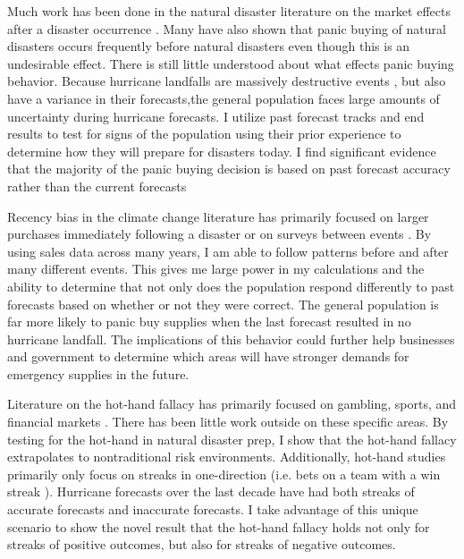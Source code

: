 \documentclass{article}
\begin{document}
Much work has been done in the natural disaster literature on the market effects after a disaster occurrence \citep{groen2008effect,semenza2011climate,deryugina2017fiscal,deryugina2018economic,sytsma2020impact}. Many have also shown that panic buying of natural disasters occurs frequently before natural disasters even though this is an undesirable effect\citep{NorrisEtAl99,Baker11,beatty2019disaster}. There is still little understood about what effects panic buying behavior. Because hurricane landfalls are massively destructive events \cite{DisasterCosts}, but also have a variance in their forecasts,the general population faces large amounts of uncertainty during hurricane forecasts. I utilize past forecast tracks and end results to test for signs of the population using their prior experience to determine how they will prepare for disasters today. I find significant evidence that the majority of the panic buying decision is based on past forecast accuracy rather than the current forecasts

Recency bias in the climate change literature has primarily focused on larger purchases immediately following a disaster \citep{hallstrom2005market,gallagher2014learning, bakkensen2019flood} or on surveys between events \cite{kelly2012evolution, MeyerEtAl14}. By using sales data across many years, I am able to follow patterns before and after many different events. This gives me large power in my calculations and the ability to determine that not only does the population respond differently to past forecasts based on whether or not they were correct. The general population is far more likely to panic buy supplies when the last forecast resulted in no hurricane landfall. The implications of this behavior could further help businesses and government to determine which areas will have stronger demands for emergency supplies in the future.

Literature on the hot-hand fallacy has primarily focused on gambling, sports, and financial markets \cite{croson2005gambler,rigotti2005uncertainty,rabin2010gambler,stockl2015hot,studer2015put}. There has been little work outside on these specific areas. By testing for the hot-hand in  natural disaster prep, I show that the hot-hand fallacy extrapolates to nontraditional risk environments. Additionally, hot-hand studies primarily only focus on streaks in one-direction (i.e. bets on a team with a win streak \citep{durand2021behavioral}). Hurricane forecasts over the last decade have had both streaks of accurate forecasts and inaccurate forecasts. I take advantage of this unique scenario to show the novel result that the hot-hand fallacy holds not only for streaks of positive outcomes, but also for streaks of negative outcomes.
\end{document}

